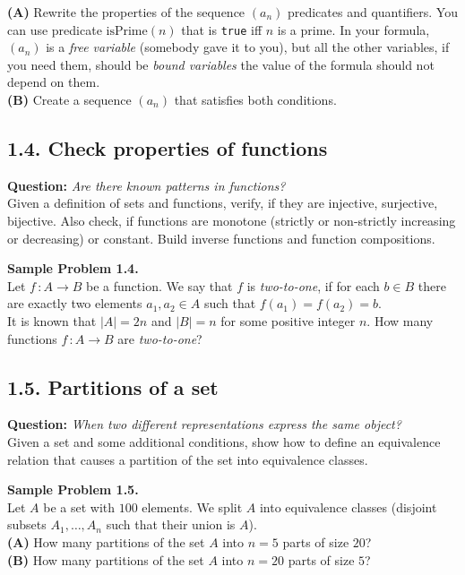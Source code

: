 \documentclass[jou]{apa6}
\begin{document}
{\bf (A)} Rewrite the properties of the sequence $(a_n)$ predicates and quantifiers. 
You can use predicate $\text{isPrime}(n)$ that is {\tt true} iff $n$ is a prime. 
In your formula, $(a_n)$ is a {\em free variable} (somebody gave it to you), 
but all the other variables, if you need them,
should be {\em bound variables} \textendash{} the value of the formula should not depend on them.\\
{\bf (B)} Create a sequence $(a_n)$ that satisfies both conditions.






\subsection{1.4. Check properties of functions}

{\bf Question:} {\em Are there known patterns in functions?}\\
{\scriptsize 
Given a definition of sets and functions, verify, if they are injective, 
surjective, bijective. Also check, if functions are monotone 
(strictly or non-strictly increasing or decreasing) or constant. 
Build inverse functions and function compositions.
}

\vspace{6pt}
{\bf Sample Problem 1.4.}\\
Let $f\,:A \rightarrow B$ be a function. We say that $f$ is {\em two-to-one}, if for
each $b \in B$ there are exactly two elements $a_1,a_2 \in A$ such that 
$f(a_1)=f(a_2) = b$.\\
It is known that $|A| = 2n$ and $|B| = n$ for some positive integer $n$. 
How many functions $f\,:A \rightarrow B$ are {\em two-to-one}?

\subsection{1.5. Partitions of a set} 

{\bf Question:} {\em When two different representations express the same object?}\\
{\scriptsize 
Given a set and some additional conditions, show how to define an equivalence 
relation that causes a partition of the set into equivalence classes. 
}


\vspace{6pt}
{\bf Sample Problem 1.5.}\\
Let $A$ be a set with $100$ elements. We split $A$ into equivalence classes
(disjoint subsets $A_1,\ldots,A_n$ such that their union is $A$).\\
{\bf (A)} How many partitions of the set $A$ into $n=5$ parts of size $20$?\\
{\bf (B)} How many partitions of the set $A$ into $n=20$ parts of size $5$?\\
\end{document}
